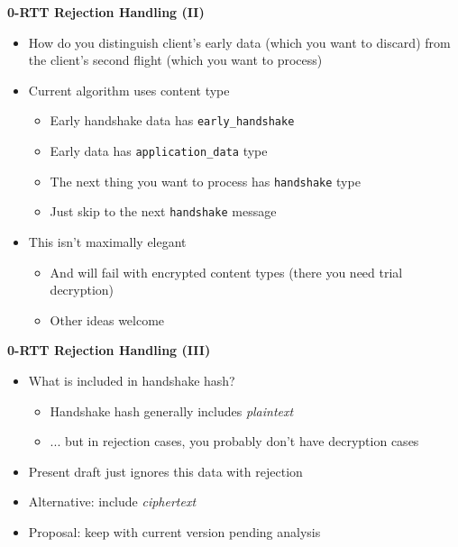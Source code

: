 \documentclass[helvetica]{seminar}
\newcommand{\heading}[1]{%
  \begin{center} 
    \large\bf 
    #1 
  \end{center} 
  \vspace{.4 in}}
\begin{document}
\begin{slide}
\heading{0-RTT Rejection Handling (II)}

\vspace{-2ex}
\begin{itemize}
\item How do you distinguish client's early data (which you want to discard) from the client's second flight (which you want to process)
\item Current algorithm uses content type
  \begin{itemize}
  \item Early handshake data has \verb^early_handshake^
  \item Early data has \verb^application_data^ type
  \item The next thing you want to process has \verb^handshake^ type
  \item Just skip to the next \verb^handshake^ message
  \end{itemize}
\item This isn't maximally elegant
  \begin{itemize}
  \item And will fail with encrypted content types (there you need trial decryption)
  \item Other ideas welcome
  \end{itemize}
\end{itemize}
\end{slide}


\begin{slide}
\heading{0-RTT Rejection Handling (III)}

\begin{itemize}
\item What is included in handshake hash?
  \begin{itemize}
  \item Handshake hash generally includes \emph{plaintext}
  \item ... but in rejection cases, you probably don't have decryption cases
  \end{itemize}

\item Present draft just ignores this data with rejection
\item Alternative: include \emph{ciphertext}
\item Proposal: keep with current version pending analysis
\end{itemize}

\end{slide}
\end{document}
